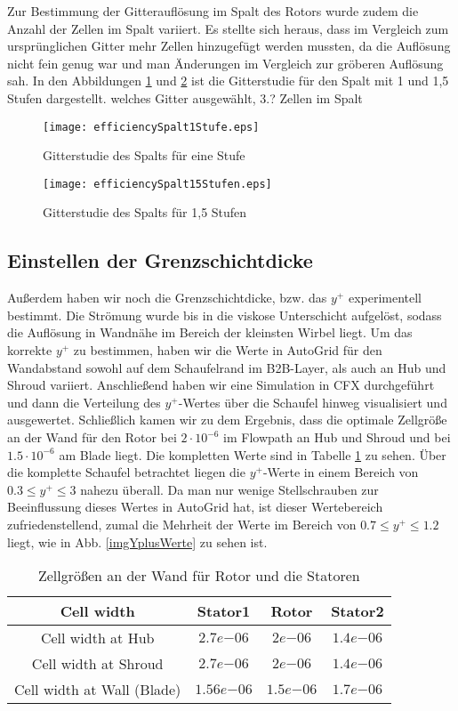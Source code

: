 Zur Bestimmung der Gitterauflösung im Spalt des Rotors wurde zudem die Anzahl der Zellen im Spalt variiert. Es stellte sich heraus, dass im Vergleich zum ursprünglichen Gitter mehr Zellen hinzugefügt werden mussten, da die Auflösung nicht fein genug war und man Änderungen im Vergleich zur gröberen Auflösung sah.  In den Abbildungen \ref{effSpalt1} und \ref{effSpalt15} ist die Gitterstudie für den Spalt mit 1 und 1,5 Stufen dargestellt. \todo welches Gitter ausgewählt, 3.? \todo Zellen im Spalt


\begin{figure}[H]
	\centering
	\texttt{[image: efficiencySpalt1Stufe.eps]}
	\caption{Gitterstudie des Spalts für eine Stufe} \label{effSpalt1}
\end{figure}

\begin{figure}[H]
	\centering
	\texttt{[image: efficiencySpalt15Stufen.eps]}
	\caption{Gitterstudie des Spalts für 1,5 Stufen} \label{effSpalt15}
\end{figure}

\subsection{Einstellen der Grenzschichtdicke}
Außerdem haben wir noch die Grenzschichtdicke, bzw. das $y^+$ experimentell bestimmt. Die Strömung wurde bis in die viskose Unterschicht aufgelöst, sodass die Auflösung in Wandnähe im Bereich der kleinsten Wirbel liegt. Um das korrekte $y^+$ zu bestimmen, haben wir die Werte in AutoGrid für den Wandabstand sowohl auf dem Schaufelrand im B2B-Layer, als auch an Hub und Shroud variiert.  Anschließend haben wir eine Simulation in CFX durchgeführt und dann die Verteilung des $y^+$-Wertes über die Schaufel hinweg visualisiert und ausgewertet. Schließlich kamen wir zu dem Ergebnis, dass die optimale Zellgröße an der Wand für den Rotor bei $2\cdot 10^{-6}$ im Flowpath an Hub und Shroud und bei $1.5\cdot 10^{-6}$ am Blade liegt. Die kompletten Werte sind in Tabelle \ref{cellWidths} zu sehen. Über die komplette Schaufel betrachtet liegen die $y^+$-Werte in einem Bereich von $0.3 \leq y^+ \leq 3$ nahezu überall. Da man nur wenige Stellschrauben zur Beeinflussung dieses Wertes in AutoGrid hat, ist dieser Wertebereich zufriedenstellend, zumal die Mehrheit der Werte im Bereich von $0.7 \leq y^+ \leq 1.2$  liegt, wie in Abb. \ref{imgYplusWerte} zu sehen ist. 

\begin{table}[H]
\centering
\begin{tabular}[t]{cccc}
\toprule
 Cell width  & Stator1 & Rotor & Stator2  \\
\midrule
Cell width at Hub & $2.7e{-06}$ & $2e{-06}$ & $1.4e{-06}$\\
Cell width at Shroud & $2.7e{-06}$ & $2e{-06}$ & $1.4e{-06}$ \\
Cell width at Wall (Blade) & $1.56e{-06}$ & $1.5e{-06}$ & $1.7e{-06}$ \\
\bottomrule
\end{tabular}
\caption{Zellgrößen an der Wand für Rotor und die Statoren} \label{cellWidths}
\end{table}


